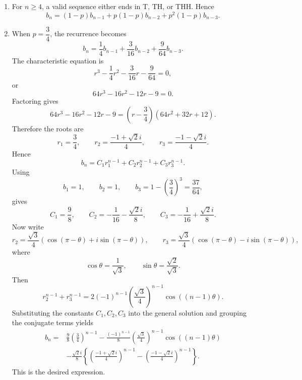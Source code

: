 \documentclass[10pt,a4paper]{article}
\begin{document}
\begin{enumerate}
  \item For $n\geq 4$, a valid sequence either ends in T, TH, or THH. Hence
        \[
          \boxed{
          b_n=(1-p)b_{n-1}
          +p(1-p)b_{n-2}
          +p^2(1-p)b_{n-3}.}
        \]

  \item When $p=\dfrac34$, the recurrence becomes
        \[
          b_n=\frac14b_{n-1}
          +\frac{3}{16}b_{n-2}
          +\frac{9}{64}b_{n-3}.
        \]
        The characteristic equation is
        \[
          r^3-\frac14r^2-\frac{3}{16}r-\frac{9}{64}=0,
        \]
        or
        \[
          64r^3-16r^2-12r-9=0.
        \]
        Factoring gives
        \[
          64r^3-16r^2-12r-9
          =
          \left(r-\frac34\right)(64r^2+32r+12).
        \]
        Therefore the roots are
        \[
          r_1=\frac34,\qquad
          r_2=\frac{-1+\sqrt2 i}{4},\qquad
          r_3=\frac{-1-\sqrt2 i}{4}.
        \]
        Hence
        \[
          b_n=C_1r_1^{n-1}+C_2r_2^{n-1}+C_3r_3^{n-1}.
        \]
        Using
        \[
          b_1=1,\qquad b_2=1,\qquad b_3=1-\left(\frac34\right)^3=\frac{37}{64},
        \]
        gives
        \[
          C_1=\frac98,\qquad
          C_2=-\frac{1}{16}-\frac{\sqrt2 i}{8},\qquad
          C_3=-\frac{1}{16}+\frac{\sqrt2 i}{8}.
        \]
        Now write
        \[
          r_2=\frac{\sqrt3}{4}(\cos(\pi-\theta)+i\sin(\pi-\theta)),
          \qquad
          r_3=\frac{\sqrt3}{4}(\cos(\pi-\theta)-i\sin(\pi-\theta)),
        \]
        where
        \[
          \cos\theta=\frac{1}{\sqrt3},
          \qquad
          \sin\theta=\frac{\sqrt2}{\sqrt3}.
        \]
        Then
        \[
          r_2^{n-1}+r_3^{n-1}
          =
          2(-1)^{n-1}
          \left(\frac{\sqrt3}{4}\right)^{n-1}
          \cos((n-1)\theta).
        \]
        Substituting the constants $C_1,C_2,C_3$ into the general solution and grouping the conjugate terms yields
        \[
          \boxed{
          \begin{aligned}
            b_n={}&
            \frac{9}{8}\left(\frac{3}{4}\right)^{n-1}
            -\frac{(-1)^{n-1}}{8}
            \left(\frac{\sqrt{3}}{4}\right)^{n-1}
            \cos((n-1)\theta) \\
            &-\frac{\sqrt{2}i}{8}
            \left\{
            \left(\frac{-1+\sqrt{2}i}{4}\right)^{n-1}
            -
            \left(\frac{-1-\sqrt{2}i}{4}\right)^{n-1}
            \right\}.
          \end{aligned}}
        \]
        This is the desired expression.
\end{enumerate}
\end{document}
